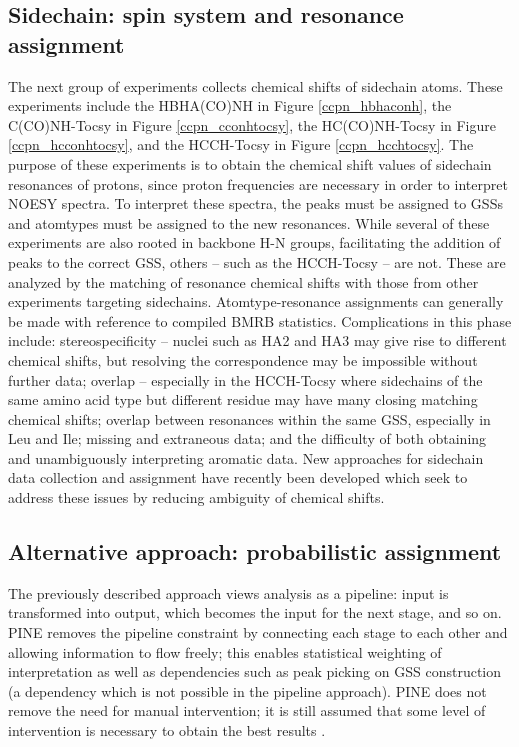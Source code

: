\subsection*{Sidechain: spin system and resonance assignment}
The next group of experiments collects chemical shifts of sidechain atoms.  
These experiments include 
the HBHA(CO)NH \cite{hbhaconh} in Figure \ref{ccpn_hbhaconh}, 
the C(CO)NH-Tocsy \cite{cconhtocsy} in Figure \ref{ccpn_cconhtocsy}, 
the HC(CO)NH-Tocsy \cite{hcconhtocsy} in Figure \ref{ccpn_hcconhtocsy}, 
and the HCCH-Tocsy \cite{hcchtocsy} in Figure \ref{ccpn_hcchtocsy}.  
The purpose of these experiments is to 
obtain the chemical shift values of sidechain resonances of protons, since 
proton frequencies are necessary in order to interpret NOESY spectra.  To 
interpret these spectra, the peaks must be assigned to GSSs and atomtypes 
must be assigned to the new resonances. While several of these experiments 
are also rooted in backbone H-N groups, facilitating the addition of peaks 
to the correct GSS, others -- such as the HCCH-Tocsy -- are not.  These are 
analyzed by the matching of resonance chemical shifts with those from other 
experiments targeting sidechains.  Atomtype-resonance assignments can generally 
be made with reference to compiled BMRB statistics.  Complications in this 
phase include: stereospecificity -- nuclei such as HA2 and HA3 may give rise 
to different chemical shifts, but resolving the correspondence may be 
impossible without further data; overlap -- especially in the HCCH-Tocsy 
where sidechains of the same amino acid type but different residue may have 
many closing matching chemical shifts; overlap between resonances within the 
same GSS, especially in Leu and Ile; missing and extraneous data; and the 
difficulty of both obtaining and unambiguously interpreting aromatic data.  
New approaches for sidechain data collection and assignment have recently 
been developed \cite{mobli2010non, hiller2008apsy} which seek to address 
these issues by reducing ambiguity of chemical shifts.

\subsection*{Alternative approach: probabilistic assignment}
The previously described approach views analysis as a pipeline: input is 
transformed into output, which becomes the input for the next stage, and so on.  
PINE \cite{pine} removes the pipeline constraint by connecting each stage to 
each other and allowing information to flow freely; this enables statistical 
weighting of interpretation as well as dependencies such as peak picking 
on GSS construction (a dependency which is not possible in the pipeline 
approach).  PINE does not remove the need for manual intervention; it is
still assumed that some level of intervention is necessary to obtain the
best results \cite{pine}.


